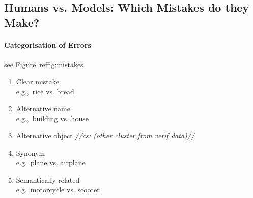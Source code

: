 \documentclass[11pt,a4paper]{article}
\newcommand{\cs}[1]{\textcolor{green!60!black}{\emph{//cs: #1//}}}
\begin{document}
\subsection{Humans vs. Models: Which Mistakes do they Make?}
\label{sect:exp_analysis}

\paragraph{Categorisation of Errors}
see Figure\ ref{fig:mistakes}
\begin{enumerate}
	\item Clear mistake \\
	e.g.,\ rice vs. bread
	\item Alternative name\\
	e.g.,\ building vs. house
	\item Alternative object \cs{(other cluster from verif data)}
	\item Synonym\\
	e.g.\ plane vs. airplane
	\item Semantically related\\
	e.g.\  motorcycle vs. scooter
\end{enumerate}
\end{document}
